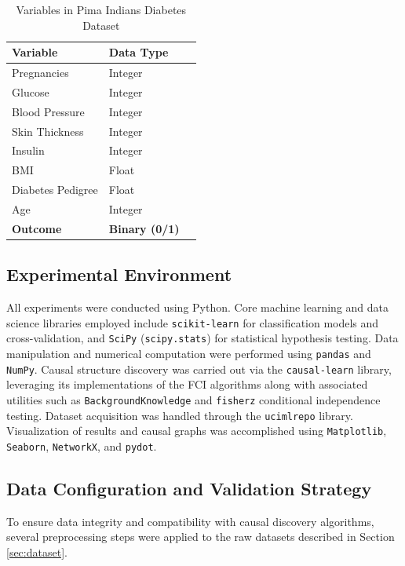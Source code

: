 \documentclass[conference, a4paper]{IEEEtran}
\begin{document}
\begin{table}[htbp]
\caption{Variables in Pima Indians Diabetes Dataset}
\begin{center}
\begin{tabular}{|l|l|l|}
\hline
\textbf{Variable} & \textbf{Data Type} \\
\hline
Pregnancies & Integer \\
Glucose & Integer \\
Blood Pressure & Integer \\
Skin Thickness & Integer \\
Insulin & Integer \\
BMI & Float \\
Diabetes Pedigree & Float \\
Age & Integer \\
\textbf{Outcome} & \textbf{Binary (0/1)} \\
\hline
\end{tabular}
\label{tab:pima_diabetes}
\end{center}
\end{table}
\subsection{Experimental Environment}
All experiments were conducted using Python. Core machine learning and data science libraries employed include \texttt{scikit-learn} for classification models and cross-validation, and \texttt{SciPy} (\texttt{scipy.stats}) for statistical hypothesis testing. Data manipulation and numerical computation were performed using \texttt{pandas} and \texttt{NumPy}. Causal structure discovery was carried out via the \texttt{causal-learn} library, leveraging its implementations of the FCI algorithms along with associated utilities such as \texttt{BackgroundKnowledge} and \texttt{fisherz} conditional independence testing. Dataset acquisition was handled through the \texttt{ucimlrepo} library. Visualization of results and causal graphs was accomplished using \texttt{Matplotlib}, \texttt{Seaborn}, \texttt{NetworkX}, and \texttt{pydot}.
\subsection{Data Configuration and Validation Strategy}

To ensure data integrity and compatibility with causal discovery algorithms, several preprocessing steps were applied to the raw datasets described in Section \ref{sec:dataset}. 
\end{document}

